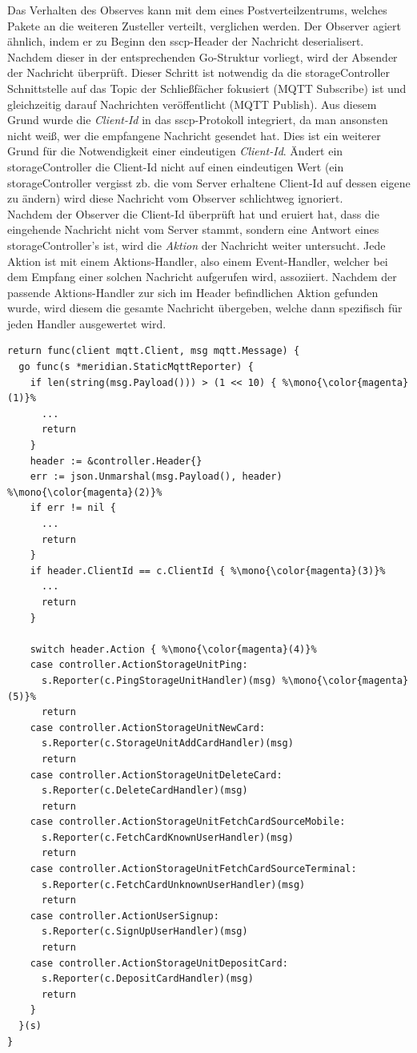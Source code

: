 \noindent
Das Verhalten des Observes kann mit dem eines Postverteilzentrums, welches Pakete an die weiteren Zusteller verteilt, verglichen werden. Der Observer agiert ähnlich, indem er zu Beginn den \acrshort{sscp}-Header der Nachricht deserialisert. Nachdem dieser in der entsprechenden Go-Struktur vorliegt, wird der Absender der Nachricht überprüft. Dieser Schritt ist notwendig da die \gls{storageController} Schnittstelle auf das Topic der Schließfächer fokusiert (MQTT Subscribe) ist und gleichzeitig darauf Nachrichten veröffentlicht (MQTT Publish). Aus diesem Grund wurde die \textit{Client-Id} in das \acrshort{sscp}-Protokoll integriert, da man ansonsten nicht weiß, wer die empfangene Nachricht gesendet hat. Dies ist ein weiterer Grund für die Notwendigkeit einer eindeutigen \textit{Client-Id}. Ändert ein \gls{storageController} die Client-Id nicht auf einen eindeutigen Wert (ein \gls{storageController} vergisst zb. die vom Server erhaltene Client-Id auf dessen eigene zu ändern) wird diese Nachricht vom Observer schlichtweg ignoriert.\\ Nachdem der Observer die Client-Id überprüft hat und eruiert hat, dass die eingehende Nachricht nicht vom Server stammt, sondern eine Antwort eines \gls{storageController}'s ist, wird die \textit{Aktion} der Nachricht weiter untersucht. Jede Aktion ist mit einem Aktions-Handler, also einem Event-Handler, welcher bei dem Empfang einer solchen Nachricht aufgerufen wird, assoziiert. Nachdem der passende Aktions-Handler zur sich im Header befindlichen Aktion gefunden wurde, wird diesem die gesamte Nachricht übergeben, welche dann spezifisch für jeden Handler ausgewertet wird.
\newpage
\vfill
\begin{lstlisting}[style=goMono,caption={\centering Weiterleitung von eingehenden \acrshort{sscp}-Nachrichten an den damit assoziierten Ereignis-Handler},label={lst:impl:observer:ex1}]
return func(client mqtt.Client, msg mqtt.Message) {
  go func(s *meridian.StaticMqttReporter) {
    if len(string(msg.Payload())) > (1 << 10) { %\mono{\color{magenta}(1)}%
      ...
      return
    }
    header := &controller.Header{}
    err := json.Unmarshal(msg.Payload(), header) %\mono{\color{magenta}(2)}%
    if err != nil {
      ...
      return
    }
    if header.ClientId == c.ClientId { %\mono{\color{magenta}(3)}%
      ...
      return
    }

    switch header.Action { %\mono{\color{magenta}(4)}%
    case controller.ActionStorageUnitPing:
      s.Reporter(c.PingStorageUnitHandler)(msg) %\mono{\color{magenta}(5)}%
      return
    case controller.ActionStorageUnitNewCard:
      s.Reporter(c.StorageUnitAddCardHandler)(msg)
      return
    case controller.ActionStorageUnitDeleteCard:
      s.Reporter(c.DeleteCardHandler)(msg)
      return
    case controller.ActionStorageUnitFetchCardSourceMobile:
      s.Reporter(c.FetchCardKnownUserHandler)(msg)
      return
    case controller.ActionStorageUnitFetchCardSourceTerminal:
      s.Reporter(c.FetchCardUnknownUserHandler)(msg)
      return
    case controller.ActionUserSignup:
      s.Reporter(c.SignUpUserHandler)(msg)
      return
    case controller.ActionStorageUnitDepositCard:
      s.Reporter(c.DepositCardHandler)(msg)
      return
    }
  }(s)
}
\end{lstlisting}
\vfill
\newpage

